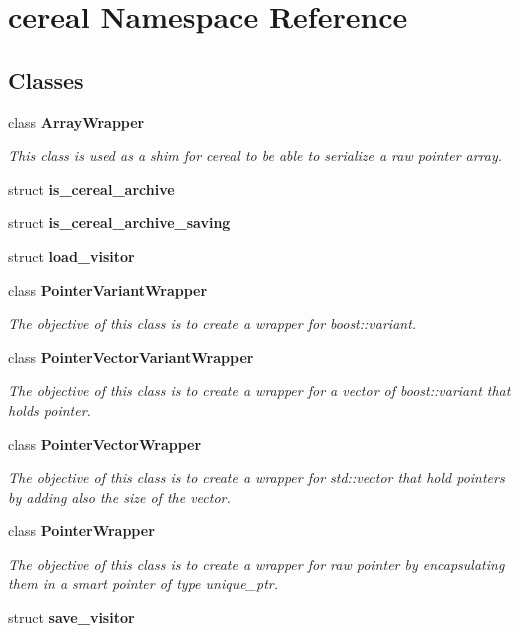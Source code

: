 \section{cereal Namespace Reference}
\label{namespacecereal}
\subsection*{Classes}
\begin{DoxyCompactItemize}
\item 
class \textbf{ Array\+Wrapper}
\begin{DoxyCompactList}\small\item\em This class is used as a shim for cereal to be able to serialize a raw pointer array. \end{DoxyCompactList}\item 
struct \textbf{ is\+\_\+cereal\+\_\+archive}
\item 
struct \textbf{ is\+\_\+cereal\+\_\+archive\+\_\+saving}
\item 
struct \textbf{ load\+\_\+visitor}
\item 
class \textbf{ Pointer\+Variant\+Wrapper}
\begin{DoxyCompactList}\small\item\em The objective of this class is to create a wrapper for boost\+::variant. \end{DoxyCompactList}\item 
class \textbf{ Pointer\+Vector\+Variant\+Wrapper}
\begin{DoxyCompactList}\small\item\em The objective of this class is to create a wrapper for a vector of boost\+::variant that holds pointer. \end{DoxyCompactList}\item 
class \textbf{ Pointer\+Vector\+Wrapper}
\begin{DoxyCompactList}\small\item\em The objective of this class is to create a wrapper for std\+::vector that hold pointers by adding also the size of the vector. \end{DoxyCompactList}\item 
class \textbf{ Pointer\+Wrapper}
\begin{DoxyCompactList}\small\item\em The objective of this class is to create a wrapper for raw pointer by encapsulating them in a smart pointer of type unique\+\_\+ptr. \end{DoxyCompactList}\item 
struct \textbf{ save\+\_\+visitor}
\end{DoxyCompactItemize}
